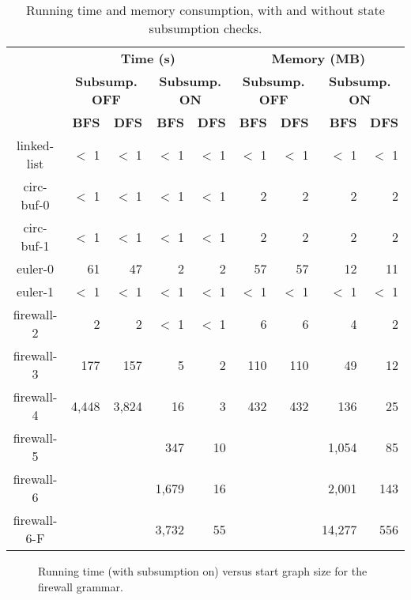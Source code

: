 \begin{table}[t]
\centering
\caption{Running time and memory consumption, with and without state subsumption
checks.}
\scriptsize
\begin{tabular}{c|rr|rr|rr|rr}
\hline
\bf \multirow{3}{*}{Grammar} & \multicolumn{4}{|c|}{\bf Time (s)} &
\multicolumn{4}{|c}{\bf Memory (MB)} \\
& \multicolumn{2}{|c|}{\bf Subsump. OFF} &
\multicolumn{2}{|c|}{\bf Subsump. ON} &
\multicolumn{2}{|c|}{\bf Subsump. OFF} &
\multicolumn{2}{|c}{\bf Subsump. ON} \\
& \bf BFS & \bf DFS
& \bf BFS & \bf DFS
& \bf BFS & \bf DFS
& \bf BFS & \bf DFS \\
\hline
linked-list & $<$ 1 & $<$ 1 & $<$ 1 & $<$ 1 & $<$ 1 & $<$ 1 & $<$ 1 & $<$ 1 \\
circ-buf-0 & $<$ 1 & $<$ 1 & $<$ 1 & $<$ 1 & 2 & 2 & 2 & 2 \\
circ-buf-1 & $<$ 1 & $<$ 1 & $<$ 1 & $<$ 1 & 2 & 2 & 2 & 2 \\
euler-0 & 61 & 47 & 2 & 2 & 57 & 57 & 12 & 11 \\
euler-1 & $<$ 1 & $<$ 1 & $<$ 1 & $<$ 1 & $<$ 1 & $<$ 1 & $<$ 1 & $<$ 1 \\
firewall-2 & 2 & 2 & $<$ 1 & $<$ 1 & 6 & 6 & 4 & 2 \\
firewall-3 & 177 & 157 & 5 & 2 & 110 & 110 & 49 & 12 \\
firewall-4 & 4,448 & 3,824 & 16 & 3 & 432 & 432 & 136 & 25 \\
firewall-5 & & & 347 & 10 & & & 1,054 & 85 \\
firewall-6 & & & 1,679 & 16 & & & 2,001 & 143 \\
firewall-6-F & & & 3,732 & 55 & & & 14,277 & 556 \\
\hline
\end{tabular}
\end{table}

\begin{figure}[t]
\centering
{}
\vspace{-2ex}
\caption{Running time (with subsumption on) versus start graph size for the
firewall grammar.}
\end{figure}
